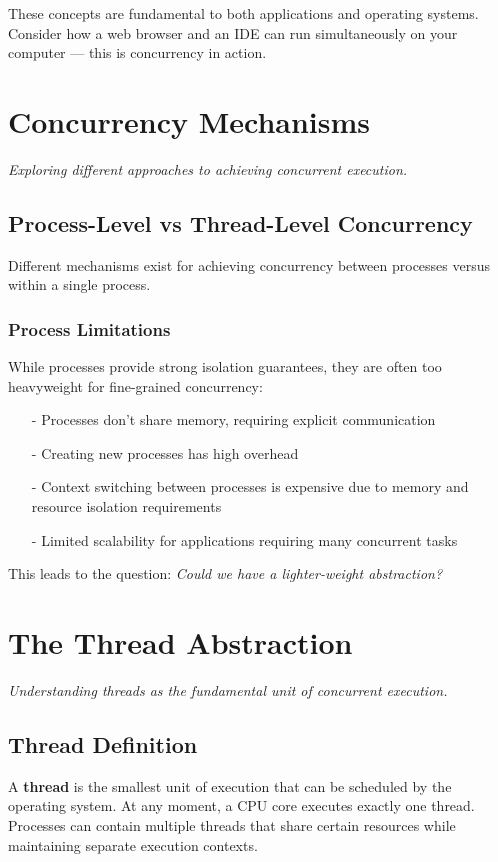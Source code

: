 \documentclass[../../compsys.tex]{subfiles}
\begin{document}
These concepts are fundamental to both applications and operating systems. Consider how a web browser and an IDE can run simultaneously on your computer — this is concurrency in action.
\newpage
\section{Concurrency Mechanisms}
\textit{Exploring different approaches to achieving concurrent execution.}

\subsection{Process-Level vs Thread-Level Concurrency}
Different mechanisms exist for achieving concurrency between processes versus within a single process.

\subsubsection{Process Limitations}
While processes provide strong isolation guarantees, they are often too heavyweight for fine-grained concurrency:
\begin{itemize}
  \item[-] Processes don't share memory, requiring explicit communication
  \item[-] Creating new processes has high overhead
  \item[-] Context switching between processes is expensive due to memory and resource isolation requirements
  \item[-] Limited scalability for applications requiring many concurrent tasks
\end{itemize}

This leads to the question: \textit{Could we have a lighter-weight abstraction?}

\section{The Thread Abstraction}
\textit{Understanding threads as the fundamental unit of concurrent execution.}

\subsection{Thread Definition}
A \textbf{thread} is the smallest unit of execution that can be scheduled by the operating system. At any moment, a CPU core executes exactly one thread. Processes can contain multiple threads that share certain resources while maintaining separate execution contexts.
\end{document}
